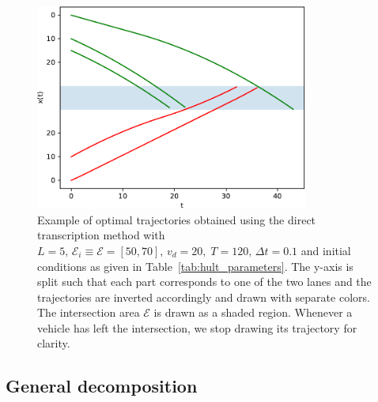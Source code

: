 \documentclass[a4paper]{article}
\theoremstyle{definition}
\theoremstyle{plain}
\begin{document}
\begin{figure}
  \centering
  \includegraphics[width=0.8\textwidth]{figures/single/trajectories_general.pdf}
  \caption{Example of optimal trajectories obtained using the direct
    transcription method with
    $L = 5, \, \mathcal{E}_{i} \equiv \mathcal{E} = [50, 70], \, v_{d} = 20, \; T=120, \, \Delta t = 0.1$
    and initial conditions as given in Table~\ref{tab:hult_parameters}. The
    y-axis is split such that each part corresponds to one of the two lanes and
    the trajectories are inverted accordingly and drawn with separate colors.
    The intersection area $\mathcal{E}$ is drawn as a shaded region. Whenever a
    vehicle has left the intersection, we stop drawing its trajectory for
    clarity.}
  \label{fig:direct_transcription_example}
\end{figure}


\subsection{General decomposition}
\end{document}
